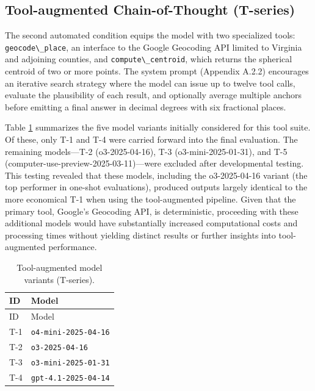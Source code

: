 \subsection{Tool-augmented Chain-of-Thought
(T-series)}\label{tool-augmented-chain-of-thought-t-series}

The second automated condition equips the model with two specialized
tools: \passthrough{\lstinline!geocode\_place!}, an interface to the
Google Geocoding API limited to Virginia and adjoining counties, and
\passthrough{\lstinline!compute\_centroid!}, which returns the spherical
centroid of two or more points. The system prompt (Appendix A.2.2)
encourages an iterative search strategy where the model can issue up to
twelve tool calls, evaluate the plausibility of each result, and
optionally average multiple anchors before emitting a final answer in
decimal degrees with six fractional places.

Table \ref{tbl:tmodels} summarizes the five model variants initially
considered for this tool suite. Of these, only T-1 and T-4 were carried
forward into the final evaluation. The remaining models---T-2
(o3-2025-04-16), T-3 (o3-mini-2025-01-31), and T-5
(computer-use-preview-2025-03-11)---were excluded after developmental
testing. This testing revealed that these models, including the
o3-2025-04-16 variant (the top performer in one-shot evaluations),
produced outputs largely identical to the more economical T-1 when using
the tool-augmented pipeline. Given that the primary tool, Google's
Geocoding API, is deterministic, proceeding with these additional models
would have substantially increased computational costs and processing
times without yielding distinct results or further insights into
tool-augmented performance.

\begin{longtable}[]{@{}ll@{}}
\caption{\label{tbl:tmodels}Tool-augmented model variants
(T-series).}\tabularnewline
\toprule\noalign{}
ID & Model \\
\midrule\noalign{}
\endfirsthead
\toprule\noalign{}
ID & Model \\
\midrule\noalign{}
\endhead
\bottomrule\noalign{}
\endlastfoot
T-1 & \passthrough{\lstinline!o4-mini-2025-04-16!} \\
T-2 & \passthrough{\lstinline!o3-2025-04-16!} \\
T-3 & \passthrough{\lstinline!o3-mini-2025-01-31!} \\
T-4 & \passthrough{\lstinline!gpt-4.1-2025-04-14!} \\
\end{longtable}


